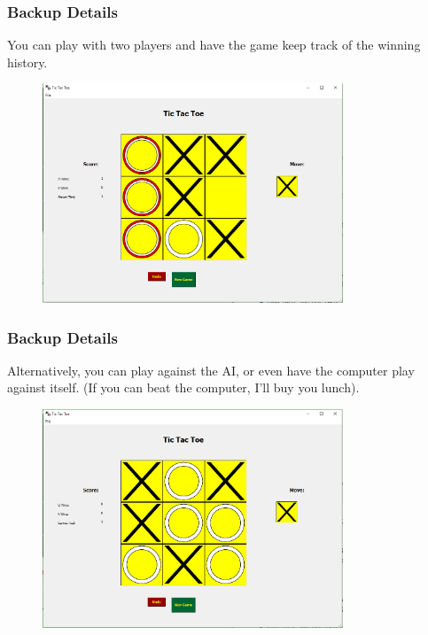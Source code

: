 \documentclass{beamer}
\begin{document}
\begin{frame}
	\frametitle{Backup Details}
	You can play with two players and have the game keep track of the winning history.
	\begin{figure}
		\centering
		\includegraphics[width=0.8\textwidth]{TicTacToe_Winner.png}
	\end{figure}
\end{frame}

\begin{frame}
	\frametitle{Backup Details}
	Alternatively, you can play against the AI, or even have the computer play against itself.  (If you can beat the computer, I'll buy you lunch).
	\begin{figure}
		\centering
		\includegraphics[width=0.8\textwidth]{TicTacToe_Computer_playing_itself.png}
	\end{figure}
\end{frame}
\end{document}
